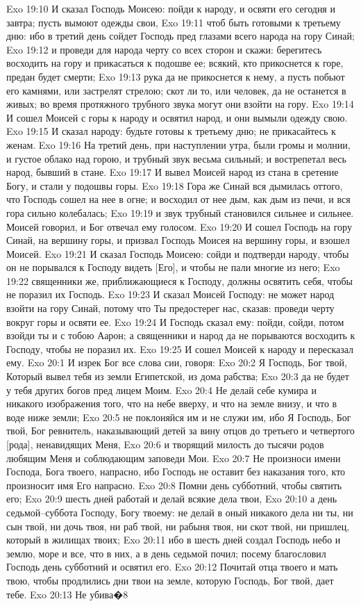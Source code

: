 Exo 19:10  И сказал Господь Моисею: пойди к народу, и освяти его сегодня и завтра; пусть вымоют одежды свои,
Exo 19:11  чтоб быть готовыми к третьему дню: ибо в третий день сойдет Господь пред глазами всего народа на гору Синай;
Exo 19:12  и проведи для народа черту со всех сторон и скажи: берегитесь восходить на гору и прикасаться к подошве ее; всякий, кто прикоснется к горе, предан будет смерти;
Exo 19:13  рука да не прикоснется к нему, а пусть побьют его камнями, или застрелят стрелою; скот ли то, или человек, да не останется в живых; во время протяжного трубного звука могут они взойти на гору.
Exo 19:14  И сошел Моисей с горы к народу и освятил народ, и они вымыли одежду свою.
Exo 19:15  И сказал народу: будьте готовы к третьему дню; не прикасайтесь к женам.
Exo 19:16  На третий день, при наступлении утра, были громы и молнии, и густое облако над горою, и трубный звук весьма сильный; и вострепетал весь народ, бывший в стане.
Exo 19:17  И вывел Моисей народ из стана в сретение Богу, и стали у подошвы горы.
Exo 19:18  Гора же Синай вся дымилась оттого, что Господь сошел на нее в огне; и восходил от нее дым, как дым из печи, и вся гора сильно колебалась;
Exo 19:19  и звук трубный становился сильнее и сильнее. Моисей говорил, и Бог отвечал ему голосом.
Exo 19:20  И сошел Господь на гору Синай, на вершину горы, и призвал Господь Моисея на вершину горы, и взошел Моисей.
Exo 19:21  И сказал Господь Моисею: сойди и подтверди народу, чтобы он не порывался к Господу видеть [Его], и чтобы не пали многие из него;
Exo 19:22  священники же, приближающиеся к Господу, должны освятить себя, чтобы не поразил их Господь.
Exo 19:23  И сказал Моисей Господу: не может народ взойти на гору Синай, потому что Ты предостерег нас, сказав: проведи черту вокруг горы и освяти ее.
Exo 19:24  И Господь сказал ему: пойди, сойди, потом взойди ты и с тобою Аарон; а священники и народ да не порываются восходить к Господу, чтобы не поразил их.
Exo 19:25  И сошел Моисей к народу и пересказал ему.
Exo 20:1  И изрек Бог все слова сии, говоря:
Exo 20:2  Я Господь, Бог твой, Который вывел тебя из земли Египетской, из дома рабства;
Exo 20:3  да не будет у тебя других богов пред лицем Моим.
Exo 20:4  Не делай себе кумира и никакого изображения того, что на небе вверху, и что на земле внизу, и что в воде ниже земли;
Exo 20:5  не поклоняйся им и не служи им, ибо Я Господь, Бог твой, Бог ревнитель, наказывающий детей за вину отцов до третьего и четвертого [рода], ненавидящих Меня,
Exo 20:6  и творящий милость до тысячи родов любящим Меня и соблюдающим заповеди Мои.
Exo 20:7  Не произноси имени Господа, Бога твоего, напрасно, ибо Господь не оставит без наказания того, кто произносит имя Его напрасно.
Exo 20:8  Помни день субботний, чтобы святить его;
Exo 20:9  шесть дней работай и делай всякие дела твои,
Exo 20:10  а день седьмой--суббота Господу, Богу твоему: не делай в оный никакого дела ни ты, ни сын твой, ни дочь твоя, ни раб твой, ни рабыня твоя, ни скот твой, ни пришлец, который в жилищах твоих;
Exo 20:11  ибо в шесть дней создал Господь небо и землю, море и все, что в них, а в день седьмой почил; посему благословил Господь день субботний и освятил его.
Exo 20:12  Почитай отца твоего и мать твою, чтобы продлились дни твои на земле, которую Господь, Бог твой, дает тебе.
Exo 20:13  Не убива�8

